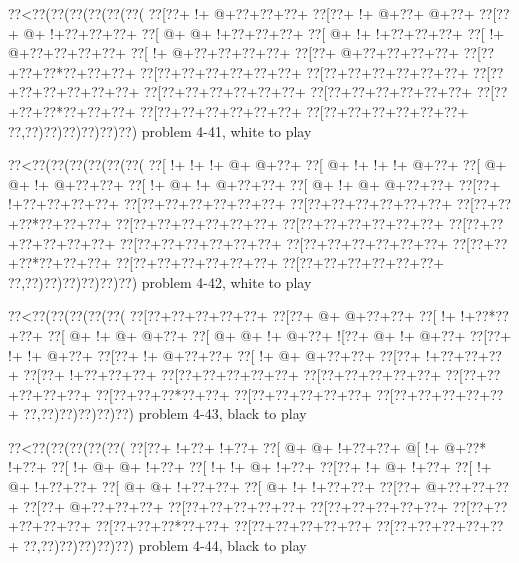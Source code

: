 \vbox{\vbox{\goo
\0??<\0??(\0??(\0??(\0??(\0??(\0??(
\0??[\0??+\- !+\- @+\0??+\0??+\0??+
\0??[\0??+\- !+\- @+\0??+\- @+\0??+
\0??[\0??+\- @+\- !+\0??+\0??+\0??+
\0??[\- @+\- @+\- !+\0??+\0??+\0??+
\0??[\- @+\- !+\- !+\0??+\0??+\0??+
\0??[\- !+\- @+\0??+\0??+\0??+\0??+
\0??[\- !+\- @+\0??+\0??+\0??+\0??+
\0??[\0??+\- @+\0??+\0??+\0??+\0??+
\0??[\0??+\0??+\0??*\0??+\0??+\0??+
\0??[\0??+\0??+\0??+\0??+\0??+\0??+
\0??[\0??+\0??+\0??+\0??+\0??+\0??+
\0??[\0??+\0??+\0??+\0??+\0??+\0??+
\0??[\0??+\0??+\0??+\0??+\0??+\0??+
\0??[\0??+\0??+\0??+\0??+\0??+\0??+
\0??[\0??+\0??+\0??*\0??+\0??+\0??+
\0??[\0??+\0??+\0??+\0??+\0??+\0??+
\0??[\0??+\0??+\0??+\0??+\0??+\0??+
\0??,\0??)\0??)\0??)\0??)\0??)\0??)
}
\hfil problem 4-41, white to play\hfil\break
}

\vbox{\vbox{\goo
\0??<\0??(\0??(\0??(\0??(\0??(\0??(
\0??[\- !+\- !+\- !+\- @+\- @+\0??+
\0??[\- @+\- !+\- !+\- !+\- @+\0??+
\0??[\- @+\- @+\- !+\- @+\0??+\0??+
\0??[\- !+\- @+\- !+\- @+\0??+\0??+
\0??[\- @+\- !+\- @+\- @+\0??+\0??+
\0??[\0??+\- !+\0??+\0??+\0??+\0??+
\0??[\0??+\0??+\0??+\0??+\0??+\0??+
\0??[\0??+\0??+\0??+\0??+\0??+\0??+
\0??[\0??+\0??+\0??*\0??+\0??+\0??+
\0??[\0??+\0??+\0??+\0??+\0??+\0??+
\0??[\0??+\0??+\0??+\0??+\0??+\0??+
\0??[\0??+\0??+\0??+\0??+\0??+\0??+
\0??[\0??+\0??+\0??+\0??+\0??+\0??+
\0??[\0??+\0??+\0??+\0??+\0??+\0??+
\0??[\0??+\0??+\0??*\0??+\0??+\0??+
\0??[\0??+\0??+\0??+\0??+\0??+\0??+
\0??[\0??+\0??+\0??+\0??+\0??+\0??+
\0??,\0??)\0??)\0??)\0??)\0??)\0??)
}
\hfil problem 4-42, white to play\hfil\break
}

\vbox{\vbox{\goo
\0??<\0??(\0??(\0??(\0??(\0??(
\0??[\0??+\0??+\0??+\0??+\0??+
\0??[\0??+\- @+\- @+\0??+\0??+
\0??[\- !+\- !+\0??*\0??+\0??+
\0??[\- @+\- !+\- @+\- @+\0??+
\0??[\- @+\- @+\- !+\- @+\0??+
\- ![\0??+\- @+\- !+\- @+\0??+
\0??[\0??+\- !+\- !+\- @+\0??+
\0??[\0??+\- !+\- @+\0??+\0??+
\0??[\- !+\- @+\- @+\0??+\0??+
\0??[\0??+\- !+\0??+\0??+\0??+
\0??[\0??+\- !+\0??+\0??+\0??+
\0??[\0??+\0??+\0??+\0??+\0??+
\0??[\0??+\0??+\0??+\0??+\0??+
\0??[\0??+\0??+\0??+\0??+\0??+
\0??[\0??+\0??+\0??*\0??+\0??+
\0??[\0??+\0??+\0??+\0??+\0??+
\0??[\0??+\0??+\0??+\0??+\0??+
\0??,\0??)\0??)\0??)\0??)\0??)
}
\hfil problem 4-43, black to play\hfil\break
}

\vbox{\vbox{\goo
\0??<\0??(\0??(\0??(\0??(\0??(
\0??[\0??+\- !+\0??+\- !+\0??+
\0??[\- @+\- @+\- !+\0??+\0??+
\- @[\- !+\- @+\0??*\- !+\0??+
\0??[\- !+\- @+\- @+\- !+\0??+
\0??[\- !+\- !+\- @+\- !+\0??+
\0??[\0??+\- !+\- @+\- !+\0??+
\0??[\- !+\- @+\- !+\0??+\0??+
\0??[\- @+\- @+\- !+\0??+\0??+
\0??[\- @+\- !+\- !+\0??+\0??+
\0??[\0??+\- @+\0??+\0??+\0??+
\0??[\0??+\- @+\0??+\0??+\0??+
\0??[\0??+\0??+\0??+\0??+\0??+
\0??[\0??+\0??+\0??+\0??+\0??+
\0??[\0??+\0??+\0??+\0??+\0??+
\0??[\0??+\0??+\0??*\0??+\0??+
\0??[\0??+\0??+\0??+\0??+\0??+
\0??[\0??+\0??+\0??+\0??+\0??+
\0??,\0??)\0??)\0??)\0??)\0??)
}
\hfil problem 4-44, black to play\hfil\break
}

